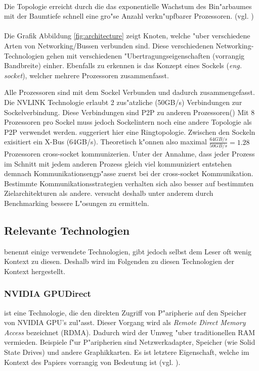 \\
Die Topologie erreicht durch die das exponentielle Wachstum des Bin"arbaumes mit der Baumtiefe schnell eine gro"se Anzahl verkn"upfbarer Prozessoren. (vgl. \cite{fattree})\\
\\
Die Grafik Abbildung \ref{fig:architecture} zeigt Knoten, welche "uber verschiedene Arten von Networking/Bussen verbunden sind. Diese verschiedenen Networking-Technologien gehen mit verschiedenen "Ubertragungseigenschaften (vorrangig Bandbreite) einher. Ebenfalls zu erkennen is das Konzept eines Sockels (\textit{eng. socket}), welcher mehrere Prozessoren zusammenfasst. 

Alle Prozessoren sind mit dem Sockel Verbunden und dadurch zusammengefasst.
Die NVLINK Technologie erlaubt 2 zus"atzliche (50GB/s) Verbindungen zur Sockelverbindung. Diese Verbindungen sind P2P zu anderen Prozessoren(\cite[FAQ, What is NVLINK?]{osummit})
Mit 8 Prozessoren pro Sockel muss jedoch Sockelintern noch eine andere Topologie als P2P verwendet werden. \cite[Abb. 1]{mainpaper} suggeriert hier eine Ringtopologie.
Zwischen den Sockeln exisitiert ein X-Bus (64GB/s).
Theoretisch k"onnen also maximal $\frac{64GB/s}{50GB/s} = 1.28$ Prozessoren cross-socket kommunizerien. Unter der Annahme, dass jeder Prozess im Schnitt mit jedem anderen Prozess gleich viel kommuniziert  entstehen demnach Kommunikationsengp"asse zuerst bei der cross-socket Kommunikation.\\
Bestimmte Kommunikationsstrategien verhalten sich also besser auf bestimmten Zielarchitekturen als andere.
\cite{mainpaper} versucht deshalb unter anderem durch Benchmarking bessere L"osungen zu ermitteln. 



\subsection{Relevante Technologien}
\cite{mainpaper} benennt einige verwendete Technologien, gibt jedoch selbst dem Leser oft wenig Kontext zu diesen. Deshalb wird im Folgenden zu diesen Technologien der Kontext hergestellt.

\subsubsection{ NVIDIA GPUDirect }
	ist eine Technologie, die den direkten Zugriff von P"aripherie auf den Speicher von NVIDIA GPU's zul"asst. Dieser Vorgang wird als \textit{Remote Direct Memory Access} bezeichnet (RDMA).
		Dadurch wird der Umweg "uber traditionellen RAM vermieden. Beispiele f"ur P"aripherien sind Netzwerkadapter, Speicher (wie Solid State Drives) und andere Graphikkarten. Es ist letztere Eigenschaft, welche im Kontext des Papiers vorrangig von Bedeutung ist (vgl. \cite{gpud}).

